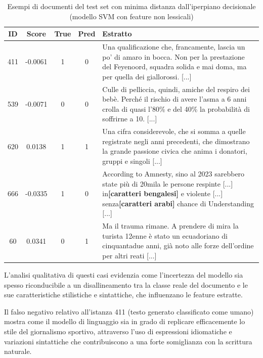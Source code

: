 \documentclass{article}
\begin{document}
\begin{table}[htbp]
\centering
\begin{tabularx}{\textwidth}{c c c c X}
\hline
\textbf{ID} & \textbf{Score} & \textbf{True} & \textbf{Pred} & \textbf{Estratto} \\
\hline

411 & -0.0061 & 1 & 0 & Una qualificazione che, francamente, lascia un po’ di amaro in bocca. Non per la prestazione del Feyenoord, squadra solida e mai doma, ma per quella dei giallorossi. [...] \\

539 & -0.0071 & 0 & 0 & Culle di pelliccia, quindi, amiche del respiro dei bebè. Perché il rischio di avere l'asma a 6 anni crolla di quasi l'80\% e del 40\% la probabilità di soffrirne a 10. [...] \\

620 & 0.0138 & 1 & 1 & Una cifra considerevole, che si somma a quelle registrate negli anni precedenti, che dimostrano la grande passione civica che anima i donatori, gruppi e singoli [...] \\

666 & -0.0335 & 1 & 0 & According to Amnesty, sino al 2023 sarebbero state pi\`u di 20mila le persone respinte [...] in\textbf{[caratteri bengalesi]} e violente [...] senza\textbf{[caratteri arabi]} chance di Understanding [...] \\

60 & 0.0341 & 0 & 1 & Ma il trauma rimane. A prendere di mira la turista 12enne è stato un ecuadoriano di cinquantadue anni, già noto alle forze dell'ordine per altri reati [...] \\

\hline
\end{tabularx}
\caption{Esempi di documenti del test set con minima distanza dall’iperpiano decisionale (modello SVM con feature non lessicali)}
\label{tab:doc_incerti}
\end{table}

L’analisi qualitativa di questi casi evidenzia come l’incertezza del modello sia spesso riconducibile a un disallineamento tra la classe reale del documento e le sue caratteristiche stilistiche e sintattiche, che influenzano le feature estratte.

Il falso negativo relativo all’istanza 411 (testo generato classificato come umano) mostra come il modello di linguaggio sia in grado di replicare efficacemente lo stile del giornalismo sportivo, attraverso l’uso di espressioni idiomatiche e variazioni sintattiche che contribuiscono a una forte somiglianza con la scrittura naturale.
\end{document}
